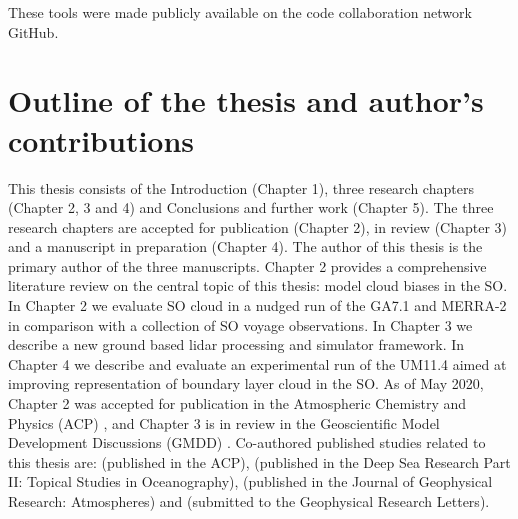 \noindent
These tools were made publicly available on the code collaboration network
GitHub.

\section{Outline of the thesis and author's contributions}

This thesis consists of the Introduction (Chapter 1), three research chapters
(Chapter 2, 3 and 4) and Conclusions and further work (Chapter 5). The three
research chapters are accepted for publication (Chapter 2),
in review (Chapter 3) and a manuscript in preparation (Chapter 4).
The author of this thesis is the primary author of the three manuscripts.
Chapter 2 provides a comprehensive literature review on the central topic
of this thesis: model cloud biases in the SO. In Chapter 2 we evaluate
SO cloud in a nudged run of the GA7.1 and MERRA-2 in comparison
with a collection of SO voyage observations. In Chapter 3 we
describe a new ground based lidar processing and simulator framework.
In Chapter 4 we describe and evaluate an experimental run of the UM11.4 aimed at
improving representation of boundary layer cloud in the SO.
As of May 2020, Chapter 2 was accepted for publication in the Atmospheric
Chemistry and Physics (ACP) \citep{kuma2020a}, and Chapter 3 is in review in the
Geoscientific Model Development Discussions (GMDD) \citep{kuma2020b}.
Co-authored published studies related to this thesis are: \cite{jolly2018}
(published in the ACP), \cite{klekociuk2018} (published in the Deep Sea Research Part II: Topical Studies in Oceanography), \cite{hartery2020a}
(published in the Journal of Geophysical Research: Atmospheres) and
\cite{hartery2020b} (submitted to the Geophysical Research Letters).
